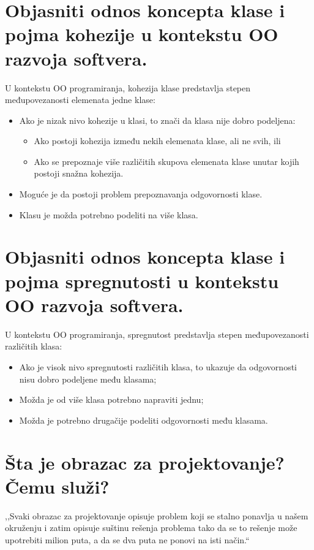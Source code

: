 \documentclass[a4paper]{article}
\begin{document}
\section{Objasniti odnos koncepta klase i pojma kohezije u kontekstu OO razvoja softvera.}
  U kontekstu OO programiranja, kohezija klase predstavlja stepen međupovezanosti elemenata jedne klase:
  \begin{itemize}
    \item Ako je nizak nivo kohezije u klasi, to znači da klasa nije dobro podeljena:
          \begin{itemize}
            \item Ako postoji kohezija između nekih elemenata klase, ali ne svih, ili
            \item Ako se prepoznaje više različitih skupova elemenata klase unutar kojih postoji snažna kohezija.
          \end{itemize}
    \item Moguće je da postoji problem prepoznavanja odgovornosti klase. 
    \item Klasu je možda potrebno podeliti na više klasa.
  \end{itemize}

\section{Objasniti odnos koncepta klase i pojma spregnutosti u kontekstu OO razvoja softvera.}
  U kontekstu OO programiranja, spregnutost predstavlja stepen međupovezanosti različitih klasa:
  \begin{itemize}
    \item Ako je visok nivo spregnutosti različitih klasa, 
          to ukazuje da odgovornosti nisu dobro podeljene među klasama;
    \item Možda je od više klasa potrebno napraviti jednu;
    \item Možda je potrebno drugačije podeliti odgovornosti među klasama.
  \end{itemize}


\section{Šta je obrazac za projektovanje? Čemu služi?}
  ,,Svaki obrazac za projektovanje opisuje problem koji se stalno ponavlja u našem okruženju i zatim
  opisuje suštinu rešenja problema tako da se to rešenje može upotrebiti milion puta, a da se
  dva puta ne ponovi na isti način.`` 
  \\
\end{document}
